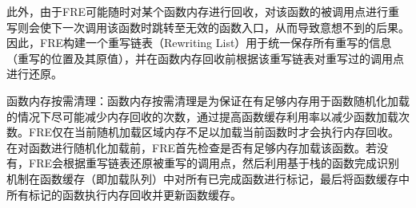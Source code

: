 \documentclass[12pt,a4paper]{ctexart}
\numberwithin{figure}{section}
\begin{document}
\par 此外，由于FRE可能随时对某个函数内存进行回收，对该函数的被调用点进行重写则会使下一次调用该函数时跳转至无效的函数入口，从而导致意想不到的后果。因此，FRE构建一个重写链表（Rewriting List）用于统一保存所有重写的信息（重写的位置及其原值），并在函数内存回收前根据该重写链表对重写过的调用点进行还原。
\par 函数内存按需清理：函数内存按需清理是为保证在有足够内存用于函数随机化加载的情况下尽可能减少内存回收的次数，通过提高函数缓存利用率以减少函数加载次数。FRE仅在当前随机加载区域内存不足以加载当前函数时才会执行内存回收。在对函数进行随机化加载前，FRE首先检查是否有足够内存加载该函数。若没有，FRE会根据重写链表还原被重写的调用点，然后利用基于栈的函数完成识别机制在函数缓存（即加载队列）中对所有已完成函数进行标记，最后将函数缓存中所有标记的函数执行内存回收并更新函数缓存。
\end{document}
